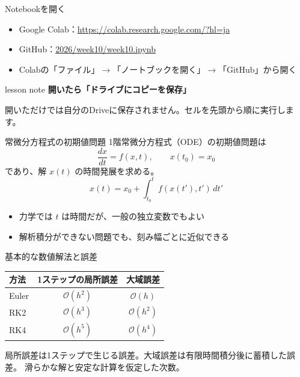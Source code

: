 \documentclass[12pt,aspectratio=43]{beamer}
\newenvironment{lessonbox}
  {\begin{beamercolorbox}[wd=\linewidth,sep=1.5mm]{lesson note}}
  {\end{beamercolorbox}\par}
\begin{document}
\begin{frame}[t]{Notebookを開く}
  \begin{itemize}
    \setlength{\itemsep}{2.5mm}
    \item Google Colab：\small\url{https://colab.research.google.com/?hl=ja}
    \item GitHub：\small\href{https://github.com/nogaki/Computational_Physics_B/tree/main/2026/week10/week10.ipynb}{2026/week10/week10.ipynb}
    \item Colabの「ファイル」\(\to\)「ノートブックを開く」\(\to\)「GitHub」から開く
  \end{itemize}
  \vspace{2mm}
  \begin{lessonbox}
    \textbf{開いたら「ドライブにコピーを保存」}\par
    \small 開いただけでは自分のDriveに保存されません。セルを先頭から順に実行します。
  \end{lessonbox}
\end{frame}

\begin{frame}[t]{常微分方程式の初期値問題}
  1階常微分方程式（ODE）の初期値問題は
  \[
    \frac{dx}{dt}=f(x,t),\qquad x(t_0)=x_0
  \]
  であり、解 $x(t)$ の時間発展を求める。
  \[
    x(t)=x_0+\int_{t_0}^{t} f(x(t'),t')\,dt'
  \]
  \begin{itemize}
    \setlength{\itemsep}{1mm}
    \item 力学では $t$ は時間だが、一般の独立変数でもよい
    \item 解析積分ができない問題でも、刻み幅ごとに近似できる
  \end{itemize}
\end{frame}

\begin{frame}[t]{基本的な数値解法と誤差}
  \begin{center}
  \renewcommand{\arraystretch}{1.5}
  \begin{tabular}{lcc}
    \hline
    方法 & 1ステップの局所誤差 & 大域誤差 \\
    \hline
    Euler & $\mathcal{O}(h^2)$ & $\mathcal{O}(h)$ \\
    RK2 & $\mathcal{O}(h^3)$ & $\mathcal{O}(h^2)$ \\
    RK4 & $\mathcal{O}(h^5)$ & $\mathcal{O}(h^4)$ \\
    \hline
  \end{tabular}
  \end{center}
  \small 局所誤差は1ステップで生じる誤差。大域誤差は有限時間積分後に蓄積した誤差。
  滑らかな解と安定な計算を仮定した次数。
\end{frame}
\end{document}
